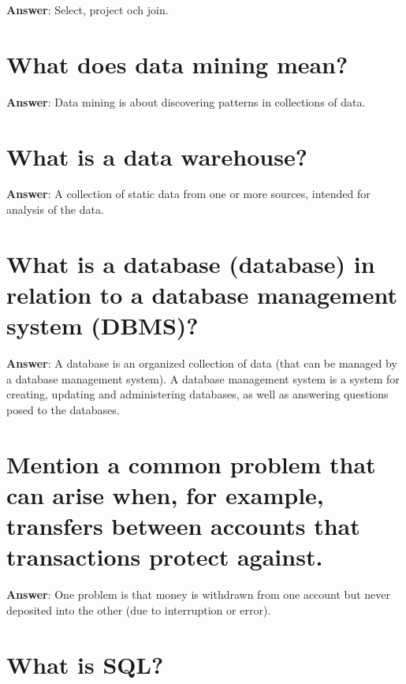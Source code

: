 \documentclass[a4paper,11pt,oneside]{book}
\begin{document}
\begin{sloppypar}
\label{q:279:sa:en:True}

\textbf{Answer}: Select, project och join.



\section{What does data mining mean?}

\label{q:280:sa:en:True}

\textbf{Answer}: Data mining is about discovering patterns in collections of data.



\section{What is a data warehouse?}

\label{q:281:sa:en:True}

\textbf{Answer}: A collection of static data from one or more sources, intended for analysis of the data.



\section{What is a database (database) in relation to a database management system (DBMS)?}

\label{q:282:sa:en:True}

\textbf{Answer}: A database is an organized collection of data (that can be managed by a database management system). A database management system is a system for creating, updating and administering databases, as well as answering questions posed to the databases.



\section{Mention a common problem that can arise when, for example, transfers between accounts that transactions protect against.}

\label{q:283:sa:en:True}

\textbf{Answer}: One problem is that money is withdrawn from one account but never deposited into the other (due to interruption or error).



\section{What is SQL?}


\end{sloppypar}
\end{document}

